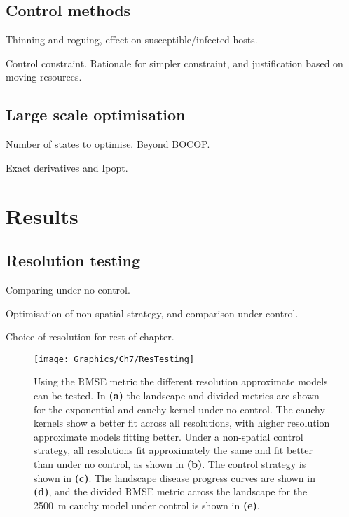 \subsection{Control methods}

Thinning and roguing, effect on susceptible/infected hosts.

Control constraint. Rationale for simpler constraint, and justification based on moving resources.

\subsection{Large scale optimisation}

Number of states to optimise. Beyond BOCOP.

Exact derivatives and Ipopt.

\section{Results}

\subsection{Resolution testing}

Comparing under no control.

Optimisation of non-spatial strategy, and comparison under control.

Choice of resolution for rest of chapter.

\begin{figure}
    \begin{center}
        \texttt{[image: Graphics/Ch7/ResTesting]}
        \caption[Using the RMSE metric to test the approximate models]{Using the RMSE metric the different resolution approximate models can be tested. In \textbf{(a)} the landscape and divided metrics are shown for the exponential and cauchy kernel under no control. The cauchy kernels show a better fit across all resolutions, with higher resolution approximate models fitting better. Under a non-spatial control strategy, all resolutions fit approximately the same and fit better than under no control, as shown in \textbf{(b)}. The control strategy is shown in \textbf{(c)}. The landscape disease progress curves are shown in \textbf{(d)}, and the divided RMSE metric across the landscape for the \SI{2500}{\meter} cauchy model under control is shown in \textbf{(e)}.}
    \end{center}
\end{figure}

